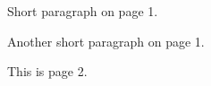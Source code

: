 \documentclass{book}
\begin{document}
Short paragraph on page 1.

Another short paragraph on page 1.

\newpage
This is page 2.
\end{document}
